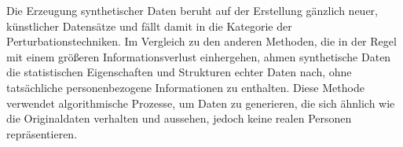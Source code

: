 \begin{spacing}{1.5}
Die Erzeugung synthetischer Daten beruht auf der Erstellung gänzlich neuer, künstlicher Datensätze und fällt damit in die Kategorie der Perturbationstechniken. Im Vergleich zu den anderen Methoden, die in der Regel mit einem größeren Informationsverlust einhergehen, ahmen synthetische Daten die statistischen Eigenschaften und Strukturen echter Daten nach, ohne tatsächliche personenbezogene Informationen zu enthalten. Diese Methode verwendet algorithmische Prozesse, um Daten zu generieren, die sich ähnlich wie die Originaldaten verhalten und aussehen, jedoch keine realen Personen repräsentieren.

\end{spacing}
